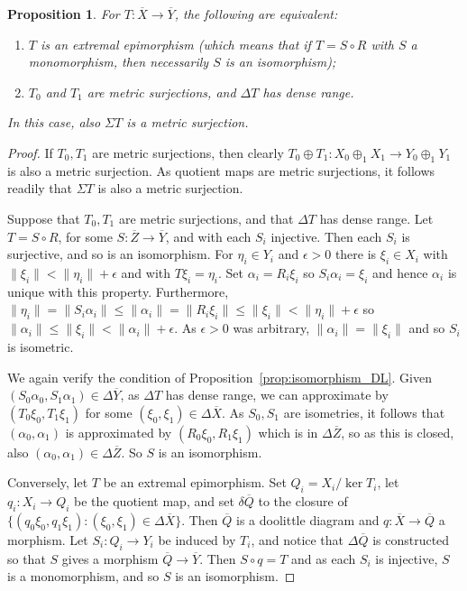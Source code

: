 \documentclass[a4paper,11pt]{article}
\theoremstyle{plain}
\newtheorem{proposition}{Proposition}[section]
\theoremstyle{remark}
\begin{document}
\begin{proposition}\label{prop:ex_epimorphism_DL}
For $T\colon\overline X\to\overline Y$, the following are equivalent:
\begin{enumerate}
  \item $T$ is an extremal epimorphism (which means that if $T = S\circ R$ with $S$ a monomorphism, then necessarily $S$ is an isomorphism);
  \item $T_0$ and $T_1$ are metric surjections, and $\Delta T$ has dense range.
\end{enumerate}
In this case, also $\Sigma T$ is a metric surjection.
\end{proposition}
\begin{proof}
If $T_0, T_1$ are metric surjections, then clearly $T_0 \oplus T_1 \colon X_0\oplus_1 X_1 \to Y_0\oplus_1 Y_1$ is also a metric surjection.  As quotient maps are metric surjections, it follows readily that $\Sigma T$ is also a metric surjection.

Suppose that $T_0, T_1$ are metric surjections, and that $\Delta T$ has dense range.  Let $T = S\circ R$, for some $S\colon\overline Z\to\overline Y$, and with each $S_i$ injective.  Then each $S_i$ is surjective, and so is an isomorphism.  For $\eta_i \in Y_i$ and $\epsilon>0$ there is $\xi_i\in X_i$ with $\|\xi_i\| < \|\eta_i\| + \epsilon$ and with $T\xi_i = \eta_i$.  Set $\alpha_i = R_i\xi_i$ so $S_i \alpha_i = \xi_i$ and hence $\alpha_i$ is unique with this property.  Furthermore, $\|\eta_i\| = \|S_i\alpha_i\| \leq \|\alpha_i\| = \|R_i\xi_i\| \leq \|\xi_i\| < \|\eta_i\| + \epsilon$ so $\|\alpha_i\| \leq \|\xi_i\| < \|\alpha_i\|+\epsilon$.  As $\epsilon>0$ was arbitrary, $\|\alpha_i\| = \|\xi_i\|$ and so $S_i$ is isometric.

We again verify the condition of Proposition~\ref{prop:isomorphism_DL}.  Given $(S_0\alpha_0, S_1\alpha_1) \in \Delta\overline Y$, as $\Delta T$ has dense range, we can approximate by $(T_0\xi_0, T_1\xi_1)$ for some $(\xi_0,\xi_1) \in \Delta\overline X$.  As $S_0, S_1$ are isometries, it follows that $(\alpha_0,\alpha_1)$ is approximated by $(R_0\xi_0, R_1\xi_1)$ which is in $\Delta\overline Z$, so as this is closed, also $(\alpha_0,\alpha_1) \in \Delta\overline Z$.  So $S$ is an isomorphism.

Conversely, let $T$ be an extremal epimorphism.  Set $Q_i = X_i / \ker T_i$, let $q_i \colon X_i\to Q_i$ be the quotient map, and set $\delta\overline Q$ to the closure of $\{ (q_0\xi_0, q_1\xi_1) : (\xi_0,\xi_1) \in \Delta\overline X \}$. Then $\overline Q$ is a doolittle diagram and $q\colon\overline X \to \overline Q$ a morphism.  Let $S_i \colon Q_i \to Y_i$ be induced by $T_i$, and notice that $\Delta\overline Q$ is constructed so that $S$ gives a morphism $\overline Q\to\overline Y$.  Then $S\circ q = T$ and as each $S_i$ is injective, $S$ is a monomorphism, and so $S$ is an isomorphism.


\end{proof}
\end{document}
